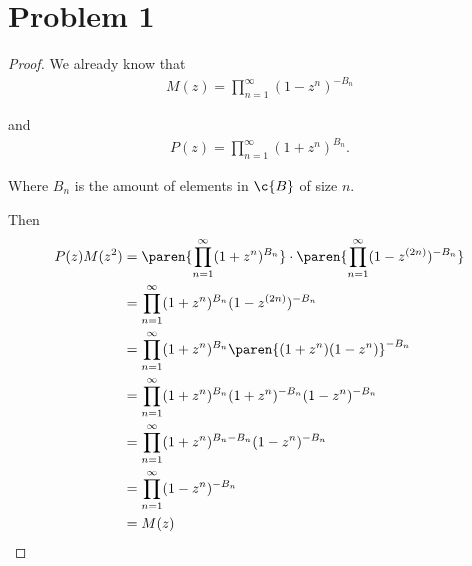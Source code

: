 ﻿\section{Problem 1}

\begin{proof}
We already know that
	\begin{align}
	    M(z) = \prod_{n = 1}^\infty (1 - z^n)^{- B_n}
	\end{align}
	
	and
	\begin{align}
	    P(z) = \prod_{n = 1}^\infty (1 + z^n)^{B_n}.
	\end{align}\pn
	
	Where $B_n$ is the amount of elements in $\c{B}$ of size $n$.\pn	
	
	Then
	\begin{align}
			P(z)M(z^2) 	&=	\paren{\prod_{n = 1}^\infty (1 + z^n)^{B_n}} \cdot \paren{\prod_{n = 1}^\infty (1 - z^{(2n)})^{- B_n}}	\\
									&=	\prod_{n = 1}^\infty (1 + z^n)^{B_n} (1 - z^{(2n)})^{- B_n}																							\\
									&=	\prod_{n = 1}^\infty (1 + z^n)^{B_n} \paren{(1 + z^n)(1 - z^n)}^{- B_n}																	\\
									&=	\prod_{n = 1}^\infty (1 + z^n)^{B_n} (1 + z^n)^{- B_n} (1 - z^n)^{- B_n}																\\
									&=	\prod_{n = 1}^\infty (1 + z^n)^{B_n - B_n} (1 - z^n)^{- B_n}																						\\
									&=	\prod_{n = 1}^\infty (1 - z^n)^{- B_n}																																	\\
									&=	M(z) \qedhere
	\end{align}
\end{proof}